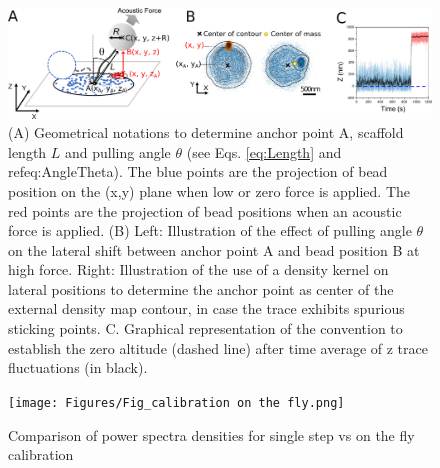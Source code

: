 \documentclass{biophys-new}
\begin{document}
\begin{figure}[hbt!]
	\centering
%

		\includegraphics[width=1\linewidth]{Figures/figS1.png}

	\caption{(A) Geometrical notations to determine anchor point A, scaffold length $L$ and pulling angle $\theta$ (see Eqs. \ref{eq:Length} and ref{eq:AngleTheta}). The blue points are the projection of bead position on the (x,y) plane when low or zero force is applied. The red points are the projection of bead positions when an acoustic force is applied. (B) Left: Illustration of the effect of pulling angle $\theta$ on the lateral shift between anchor point A and bead position B at high force. Right: Illustration of the use of a density kernel on lateral positions to determine the anchor point as center of the external density map contour, in case the trace exhibits spurious sticking points. C. Graphical representation of the convention to establish the zero altitude (dashed line) after time average of z trace fluctuations (in black).}
	\label{fig:Lengthcalculation}
\end{figure}

\begin{figure}[hbt!]
	\centering

	\centerline {\texttt{[image: Figures/Fig\_calibration on the fly.png]}}
	\caption{Comparison of power spectra densities for single step vs on the fly calibration}
	\label{fig:Onthefly}	
\end{figure}
\end{document}
